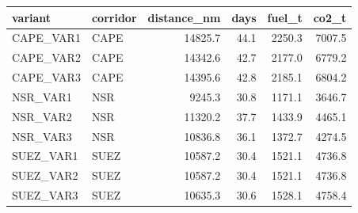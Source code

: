\begin{tabular}{llrrrr}
\toprule
  variant & corridor &  distance\_nm &  days &  fuel\_t &  co2\_t \\
\midrule
CAPE\_VAR1 &     CAPE &      14825.7 &  44.1 &  2250.3 & 7007.5 \\
CAPE\_VAR2 &     CAPE &      14342.6 &  42.7 &  2177.0 & 6779.2 \\
CAPE\_VAR3 &     CAPE &      14395.6 &  42.8 &  2185.1 & 6804.2 \\
 NSR\_VAR1 &      NSR &       9245.3 &  30.8 &  1171.1 & 3646.7 \\
 NSR\_VAR2 &      NSR &      11320.2 &  37.7 &  1433.9 & 4465.1 \\
 NSR\_VAR3 &      NSR &      10836.8 &  36.1 &  1372.7 & 4274.5 \\
SUEZ\_VAR1 &     SUEZ &      10587.2 &  30.4 &  1521.1 & 4736.8 \\
SUEZ\_VAR2 &     SUEZ &      10587.2 &  30.4 &  1521.1 & 4736.8 \\
SUEZ\_VAR3 &     SUEZ &      10635.3 &  30.6 &  1528.1 & 4758.4 \\
\bottomrule
\end{tabular}
